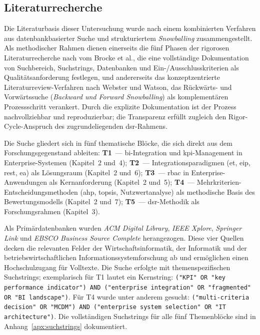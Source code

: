 \subsection{Literaturrecherche}
\label{sec:literaturrecherche}

Die Literaturbasis dieser Untersuchung wurde nach einem kombinierten Verfahren aus datenbankbasierter Suche und strukturiertem \textit{Snowballing} zusammengestellt.
Als methodischer Rahmen dienen einerseits die fünf Phasen der rigorosen Literaturrecherche nach vom Brocke et al., die eine vollständige Dokumentation von Suchbereich, Suchstrings, Datenbanken und Ein-/Ausschlusskriterien als Qualitätsanforderung festlegen, und andererseits das konzeptzentrierte Literaturreview-Verfahren nach Webster und Watson, das Rückwärts- und Vorwärtssuche (\textit{Backward und Forward Snowballing}) als komplementären Prozessschritt verankert.
Durch die explizite Dokumentation ist der Prozess nachvollziehbar und reproduzierbar; die Transparenz erfüllt zugleich den Rigor-Cycle-Anspruch des zugrundeliegenden \gls{dsr}-Rahmens.

Die Suche gliedert sich in fünf thematische Blöcke, die sich direkt aus dem Forschungsgegenstand ableiten:
\textbf{T1}~— \gls{bi}-Integration und \gls{kpi}-Management in Enterprise-Systemen (Kapitel~2 und~4);
\textbf{T2}~— Integrationsparadigmen (\gls{et}, \gls{eip}, \gls{rest}, \gls{ea}) als Lösungsraum (Kapitel~2 und~6);
\textbf{T3}~— \gls{rbac} in Enterprise-Anwendungen als Kernanforderung (Kapitel~2 und~5);
\textbf{T4}~— Mehrkriterien-Entscheidungsmethoden (\gls{ahp}, \gls{topsis}, Nutzwertanalyse) als methodische Basis des Bewertungsmodells (Kapitel~2 und~7);
\textbf{T5}~— \gls{dsr}-Methodik als Forschungsrahmen (Kapitel~3).

Als Primärdatenbanken wurden \textit{ACM Digital Library}, \textit{IEEE Xplore}, \textit{Springer Link} und \textit{EBSCO Business Source Complete} herangezogen.
Diese vier Quellen decken die relevanten Felder der Wirtschaftsinformatik, der Informatik und der betriebswirtschaftlichen Informationssystemforschung ab und ermöglichen einen Hochschulzugang für Volltexte.
Die Suche erfolgte mit themenspezifischen Suchstrings; exemplarisch für T1 lautet ein Kernstring: \texttt{("KPI" OR "key performance indicator") AND ("enterprise integration" OR "fragmented" OR "BI landscape")}.
Für T4 wurde unter anderem gesucht: \texttt{("multi-criteria decision" OR "MCDM") AND ("enterprise system selection" OR "IT architecture")}.
Die vollständigen Suchstrings für alle fünf Themenblöcke sind in Anhang~\ref{apx:suchstrings} dokumentiert.

